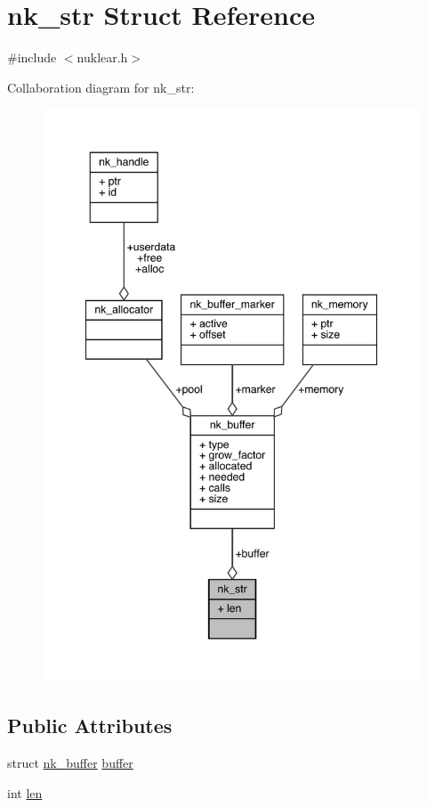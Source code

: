 \hypertarget{structnk__str}{}\section{nk\+\_\+str Struct Reference}
\label{structnk__str}


{\ttfamily \#include $<$nuklear.\+h$>$}



Collaboration diagram for nk\+\_\+str\+:
\nopagebreak
\begin{figure}[H]
\begin{center}
\leavevmode
\includegraphics[width=348pt]{structnk__str__coll__graph}
\end{center}
\end{figure}
\subsection*{Public Attributes}
\begin{DoxyCompactItemize}
\item 
struct \mbox{\hyperlink{structnk__buffer}{nk\+\_\+buffer}} \mbox{\hyperlink{structnk__str_af09f932d4972189976784f9f6974e894}{buffer}}
\item 
int \mbox{\hyperlink{structnk__str_a3190eef31e3749578754e537adb19610}{len}}
\end{DoxyCompactItemize}


